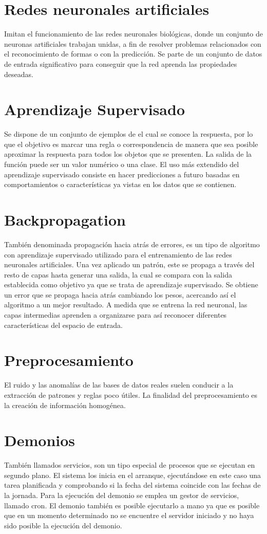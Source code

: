 \section{Redes neuronales artificiales}
Imitan el funcionamiento de las redes neuronales biológicas, donde un conjunto de neuronas artificiales trabajan unidas, a fin de resolver problemas relacionados con el reconocimiento de formas o con la predicción. Se parte de un conjunto de datos de entrada significativo para conseguir que la red aprenda las propiedades deseadas.

\section{Aprendizaje Supervisado}
Se dispone de un conjunto de ejemplos de el cual se conoce la respuesta, por lo que el objetivo es marcar una regla o correspondencia de manera que sea posible aproximar la respuesta para todos los objetos que se presenten. La salida de la función puede ser un valor numérico o una clase\cite{contributors_phpmyadmin_????}.
El uso más extendido del aprendizaje supervisado consiste en hacer predicciones a futuro basadas en comportamientos o características ya vistas en los datos que se contienen\cite{_machine_learning_2014}.

\section{Backpropagation}
También denominada propagación hacia atrás de errores, es un tipo de algoritmo con aprendizaje supervisado utilizado para el entrenamiento de las redes neuronales artificiales. Una vez aplicado un patrón, este se propaga a través del resto de capas hasta generar una salida, la cual se compara con la salida establecida como objetivo ya que se trata de aprendizaje supervisado. Se obtiene un error que se propaga hacia atrás cambiando los pesos, acercando así el algoritmo a un mejor resultado.
A medida que se entrena la red neuronal, las capas intermedias aprenden a organizarse para así reconocer diferentes características del espacio de entrada.\cite{mazur_step_2015}

\section{Preprocesamiento}
El ruido y las anomalías de las bases de datos reales suelen conducir a la extracción de patrones y reglas poco útiles. La finalidad del preprocesamiento es la creación de información homogénea.

\section{Demonios}
También llamados servicios, son un tipo especial de procesos que se ejecutan en segundo plano.
El sistema los inicia en el arranque, ejecutándose en este caso una tarea planificada y comprobando si la fecha del sistema coincide con las fechas de la jornada. Para la ejecución del demonio se emplea un gestor de servicios, llamado cron. El demonio también es posible ejecutarlo a mano ya que es posible que en un momento determinado no se encuentre el servidor iniciado y no haya sido posible la ejecución del demonio\citep{torres_servicios_2013}.